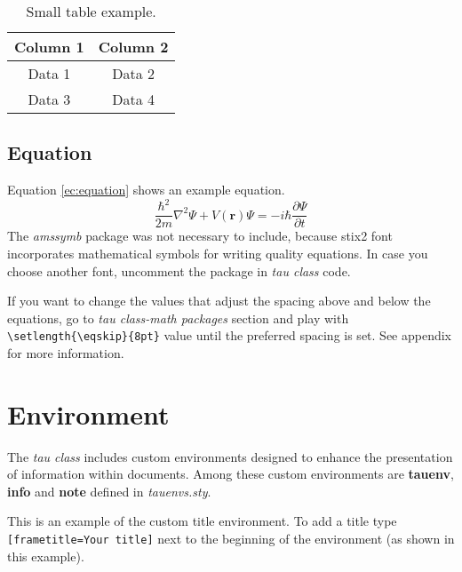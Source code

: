 \documentclass[9pt,a4paper,twoside]{tau}
\begin{document}
            \begin{table}[H]
                \centering
                \caption{Small table example.}
    		\label{tab:table}
                \begin{tabular}{cc}
            	\toprule
                    \textbf{Column 1} & \textbf{Column 2} \\
                    \midrule
                    Data 1 & Data 2 \\
                    Data 3 & Data 4 \\
                    \bottomrule
                \end{tabular}
                    
                    
            \end{table}

    \subsection{Equation}
    
        Equation \ref{ec:equation} shows an example equation. 
    	\begin{equation} \label{ec:equation}
                \frac{\hbar^2}{2m}\nabla^2\Psi + V(\mathbf{r})\Psi = -i\hbar \frac{\partial\Psi}{\partial t}
    	\end{equation} 
        The \textit{amssymb} package was not necessary to include, because stix2 font incorporates mathematical symbols for writing quality equations. In case you choose another font, uncomment the package in \textit{tau class} code.

        If you want to change the values that adjust the spacing above and below the equations, go to \textit{tau class-math packages} section and play with \verb|\setlength{\eqskip}{8pt}| value until the preferred spacing is set. See appendix for more information.

\section{Environment}

    The \textit{tau class} includes custom environments designed to enhance the presentation of information within documents. Among these custom environments are \textbf{tauenv}, \textbf{info} and \textbf{note} defined in \textit{tauenvs.sty}.

    \begin{tauenv}[frametitle=Custom title]
        This is an example of the custom title environment. To add a title type \verb|[frametitle=Your title]| next to the beginning of the environment (as shown in this example).
    \end{tauenv}
\end{document}
